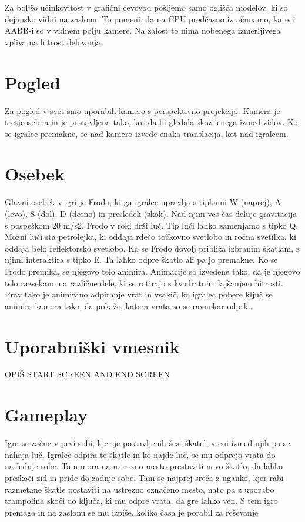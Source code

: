 \documentclass[a4paper,12pt]{article}
\begin{document}
Za boljšo učinkovitost v grafični cevovod pošljemo samo oglišča modelov, ki so dejansko vidni na zaslonu. To pomeni, da na CPU predčasno izračunamo, kateri AABB-i so v vidnem polju kamere. Na žalost to nima nobenega izmerljivega vpliva na hitrost delovanja.


\newpage

\section{Pogled}
\noindent Za pogled v svet smo uporabili kamero s perspektivno projekcijo. Kamera je tretjeosebna in je postavljena tako, kot da bi gledala skozi enega izmed zidov. Ko se igralec premakne, se nad kamero izvede enaka translacija, kot nad igralcem.

\newpage

\section{Osebek}
\noindent Glavni osebek v igri je Frodo, ki ga igralec upravlja s tipkami W (naprej), A (levo), S (dol), D (desno) in presledek (skok). Nad njim ves čas deluje gravitacija s pospeškom 20 m/s2. Frodo v roki drži luč. Tip luči lahko zamenjamo s tipko Q. Možni luči sta petrolejka, ki oddaja rdečo točkovno svetlobo in ročna svetilka, ki oddaja belo reflektorsko svetlobo. Ko se Frodo dovolj približa izbranim škatlam, z njimi interaktira s tipko E. Ta lahko odpre škatlo ali pa jo premakne.
Ko se Frodo premika, se njegovo telo animira. Animacije so izvedene tako, da je njegovo telo razsekano na različne dele, ki se rotirajo s kvadratnim lajšanjem hitrosti. Prav tako je animirano odpiranje vrat in vsakič, ko igralec pobere ključ se animira kamera tako, da pokaže, katera vrata so se ravnokar odprla.

\newpage

\section{Uporabniški vmesnik}
\noindent OPIŠ  START SCREEN AND END SCREEN

\newpage

\section{Gameplay}
\noindent Igra se začne v prvi sobi, kjer je postavljenih šest škatel, v eni izmed njih pa se nahaja luč. Igralec odpira te škatle in ko najde luč, se mu odprejo vrata do naslednje sobe. Tam mora na ustrezno mesto prestaviti novo škatlo, da lahko preskoči zid in pride do zadnje sobe. Tam se najprej sreča z uganko, kjer rabi razmetane škatle postaviti na ustrezno označeno mesto, nato pa z uporabo trampolina skoči do ključa, ki mu odpre vrata, da gre lahko ven. S tem igro premaga in na zaslonu se mu izpiše, koliko časa je porabil za reševanje
\end{document}

